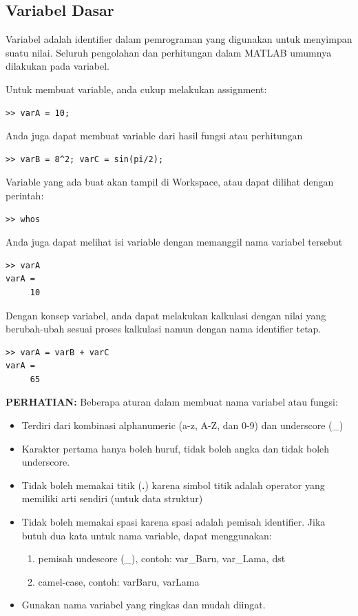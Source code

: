 \documentclass[12pt]{book}
\begin{document}
	\subsection{Variabel Dasar}
	
	Variabel adalah identifier dalam pemrograman yang digunakan untuk menyimpan suatu nilai.
	Seluruh pengolahan dan perhitungan dalam MATLAB umumnya dilakukan pada variabel.
	
	Untuk membuat variable, anda cukup melakukan assignment:
	\begin{verbatim}
>> varA = 10;
	\end{verbatim}

	Anda juga dapat membuat variable dari hasil fungsi atau perhitungan
	\begin{verbatim}
>> varB = 8^2; varC = sin(pi/2);
	\end{verbatim}

	Variable yang ada buat akan tampil di Workspace, atau dapat dilihat dengan perintah:
	\begin{verbatim}
>> whos
	\end{verbatim}

	\newpage
	Anda juga dapat melihat isi variable dengan memanggil nama variabel tersebut
	\begin{verbatim}
>> varA
varA =
     10
	\end{verbatim}

	Dengan konsep variabel, anda dapat melakukan kalkulasi dengan nilai yang berubah-ubah sesuai proses kalkulasi namun dengan nama identifier tetap.
	\begin{verbatim}
>> varA = varB + varC
varA =
     65
	\end{verbatim}

	\textbf{PERHATIAN:} Beberapa aturan dalam membuat nama variabel atau fungsi:
	\begin{itemize}
		\item Terdiri dari kombinasi alphanumeric (a-z, A-Z, dan 0-9) dan underscore (\_)
		\item Karakter pertama hanya boleh huruf, tidak boleh angka dan tidak boleh underscore.
		\item Tidak boleh memakai titik (\textbf{.}) karena simbol titik adalah operator yang memiliki arti sendiri (untuk data struktur)
		\item Tidak boleh memakai spasi karena spasi adalah pemisah identifier.
		Jika butuh dua kata untuk nama variable, dapat menggunakan:
		\begin{enumerate}
			\item pemisah undescore (\_), contoh: var\_Baru, var\_Lama, dst
			\item camel-case, contoh: varBaru, varLama
		\end{enumerate}
		\item Gunakan nama variabel yang ringkas dan mudah diingat.
	\end{itemize}
	
\end{document}
